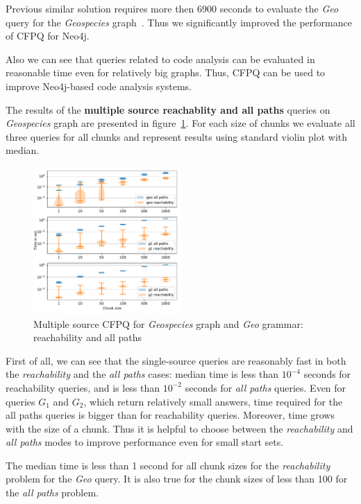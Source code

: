 Previous similar solution requires more then 6900 seconds to evaluate the \textit{Geo} query for the \textit{Geospecies} graph~\cite{Kuijpers:2019:ESC:3335783.3335791}. Thus we significantly improved the performance of CFPQ for Neo4j.

Also we can see that queries related to code analysis can be evaluated in reasonable time even for relatively big graphs. Thus, CFPQ can be used to improve Neo4j-based code analysis systems. 

The results of the \textbf{multiple source reachablity and all paths} queries on \textit{Geospecies} graph are presented in figure~\ref{fig:geo_multiple_source}. For each size of chunks we evaluate all three queries for all chunks and represent results using standard violin plot with median.

\begin{figure}
    \centering
    \includegraphics[width=0.5\textwidth]{geospecies_chunks.pdf}
    \caption{Multiple source CFPQ for \textit{Geospecies} graph and \textit{Geo} grammar: reachability and all paths}
    \label{fig:geo_multiple_source}
\end{figure}


First of all, we can see that the single-source queries are reasonably fast in both the \textit{reachability} and the \textit{all paths} cases: median time is less than $10^{-4}$ seconds for reachability queries, and is less than $10^{-2}$ seconds for \textit{all paths} queries. Even for queries $G_1$ and $G_2$, which return relatively small answers, time required for the all paths queries is bigger than for reachability queries. Moreover, time grows with the size of a chunk. Thus it is helpful to choose between the \textit{reachability} and \textit{all paths} modes to improve performance even for small start sets.

The median time is less than 1 second for all chunk sizes for the \textit{reachability} problem for the \textit{Geo} query. It is also true for the chunk sizes of less than 100 for the \textit{all paths} problem.

